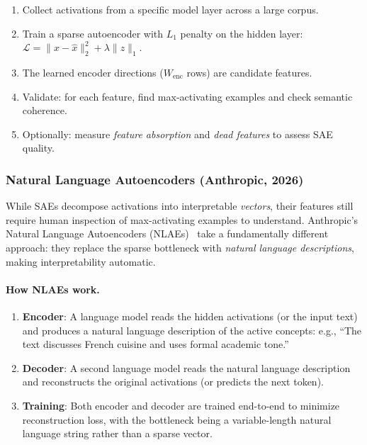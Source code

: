 \begin{keybox}
\begin{enumerate}
  \item Collect activations from a specific model layer across a large corpus.
  \item Train a sparse autoencoder with $L_1$ penalty on the hidden layer: $\mathcal{L} = \|x - \hat{x}\|_2^2 + \lambda \|z\|_1$.
  \item The learned encoder directions ($W_{\text{enc}}$ rows) are candidate features.
  \item Validate: for each feature, find max-activating examples and check semantic coherence.
  \item Optionally: measure \emph{feature absorption} and \emph{dead features} to assess SAE quality.
\end{enumerate}
\end{keybox}

\subsubsection{Natural Language Autoencoders (Anthropic, 2026)}
\label{natural-language-autoencoders-anthropic-2026}

While SAEs decompose activations into interpretable \emph{vectors}, their features still require human inspection of max-activating examples to understand. Anthropic’s Natural Language Autoencoders (NLAEs)~\cite{anthropic2026nla} take a fundamentally different approach: they replace the sparse bottleneck with \emph{natural language descriptions}, making interpretability automatic.

\paragraph{How NLAEs work.}
\label{how-nlaes-work.}

\begin{enumerate}
  \item \textbf{Encoder}: A language model reads the hidden activations (or the input text) and produces a natural language description of the active concepts: e.g., ``The text discusses French cuisine and uses formal academic tone.''
  \item \textbf{Decoder}: A second language model reads the natural language description and reconstructs the original activations (or predicts the next token).
  \item \textbf{Training}: Both encoder and decoder are trained end-to-end to minimize reconstruction loss, with the bottleneck being a variable-length natural language string rather than a sparse vector.
\end{enumerate}

